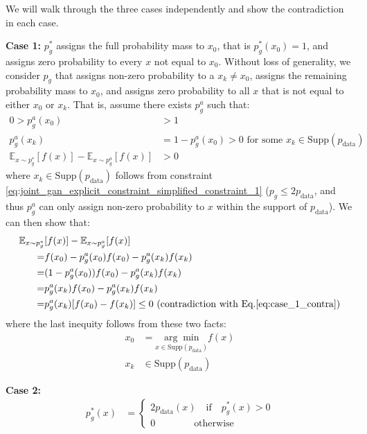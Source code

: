We will walk through the three cases independently and show the contradiction in each case.

\textbf{Case 1:} $p^*_{g}$ assigns the full probability mass to $x_0$, that is $p^*_{g} (x_0) = 1$, and assigns zero probability to every $x$ not equal to $x_0$. Without loss of generality, we consider $p_g$ that assigns non-zero probability to a $x_k \neq x_0$, assigns the remaining probability mass to $x_0$, and assigns zero probability to all $x$ that is not equal to either $x_0$ or $x_k$. That is, assume there exists $p^a_g$ such that:
\begin{align}
    0 > p^a_g (x_0) & > 1 \\ 
    p^a_g (x_k) & = 1 - p^a_g (x_0) > 0 \text{ for some } x_k \in \text{Supp}( p_{\text{data}} ) \\ 
    \mathbb{E}_{ x \sim p^*_g } [ f ( x ) ] - \mathbb{E}_{ x \sim p^a_g } [ f ( x ) ]& > 0 \label{eq:case_1_contra}
\end{align}
where $x_k \in \text{Supp}( p_{\text{data}} ) $ follows from constraint \ref{eq:joint_gan_explicit_constraint_simplified_constraint_1} ($p_g \leq 2 p_{\text{data}} $, and thus $p^a_g$ can only assign non-zero probability to $x$ within the support of $p_{\text{data}}$).
We can then show that:
\begin{align}
\mathbb{E}_{ x \sim p^*_g } & [ f ( x ) ] - \mathbb{E}_{ x \sim p^a_g } [ f ( x ) ] \\
= & f(x_0) - p^a_g (x_0) f(x_0) - p^a_g (x_k) f(x_k) \\
= & ( 1 - p^a_g (x_0) ) f(x_0) - p^a_g (x_k) f(x_k) \\
= & p^a_g (x_k) f(x_0) - p^a_g (x_k) f(x_k) \\
= & p^a_g (x_k) [ f(x_0) - f(x_k) ] \leq 0 \text{ (contradiction with Eq.} \ref{eq:case_1_contra} )
\end{align}
where the last inequity follows from these two facts:
\begin{align}
    x_0 & = \underset{x \in \text{Supp}( p_{\text{data}} ) }{\arg\min} f(x) \\
    x_k & \in \text{Supp}( p_{\text{data}} )
\end{align}

\textbf{Case 2:} 
\begin{align}
    p^*_{g} (x) & = \begin{cases}
    2p_{\text{data}} (x) \quad  \text{if} \quad p^*_{g} (x) > 0 \\
    0 \quad \quad  \quad \quad \text{otherwise}
    \end{cases}
\end{align}

